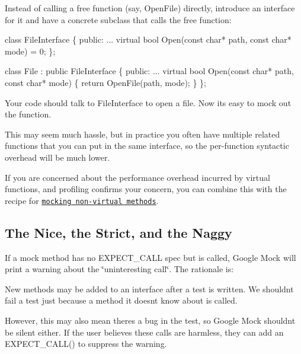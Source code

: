 Instead of calling a free function (say, {\ttfamily Open\+File}) directly, introduce an interface for it and have a concrete subclass that calls the free function\+:


\begin{DoxyCode}
\textcolor{keyword}{class }FileInterface \{
 \textcolor{keyword}{public}:
  ...
  \textcolor{keyword}{virtual} \textcolor{keywordtype}{bool} Open(\textcolor{keyword}{const} \textcolor{keywordtype}{char}* path, \textcolor{keyword}{const} \textcolor{keywordtype}{char}* mode) = 0;
\};

\textcolor{keyword}{class }File : \textcolor{keyword}{public} FileInterface \{
 \textcolor{keyword}{public}:
  ...
  \textcolor{keyword}{virtual} \textcolor{keywordtype}{bool} Open(\textcolor{keyword}{const} \textcolor{keywordtype}{char}* path, \textcolor{keyword}{const} \textcolor{keywordtype}{char}* mode) \{
    \textcolor{keywordflow}{return} OpenFile(path, mode);
  \}
\};
\end{DoxyCode}


Your code should talk to {\ttfamily File\+Interface} to open a file. Now it\textquotesingle{}s easy to mock out the function.

This may seem much hassle, but in practice you often have multiple related functions that you can put in the same interface, so the per-\/function syntactic overhead will be much lower.

If you are concerned about the performance overhead incurred by virtual functions, and profiling confirms your concern, you can combine this with the recipe for \href{#mocking-nonvirtual-methods}{\tt mocking non-\/virtual methods}.

\subsection*{The Nice, the Strict, and the Naggy}

If a mock method has no {\ttfamily E\+X\+P\+E\+C\+T\+\_\+\+C\+A\+LL} spec but is called, Google Mock will print a warning about the \char`\"{}uninteresting call\char`\"{}. The rationale is\+:


\begin{DoxyItemize}
\item New methods may be added to an interface after a test is written. We shouldn\textquotesingle{}t fail a test just because a method it doesn\textquotesingle{}t know about is called.
\item However, this may also mean there\textquotesingle{}s a bug in the test, so Google Mock shouldn\textquotesingle{}t be silent either. If the user believes these calls are harmless, they can add an {\ttfamily E\+X\+P\+E\+C\+T\+\_\+\+C\+A\+L\+L()} to suppress the warning.
\end{DoxyItemize}

